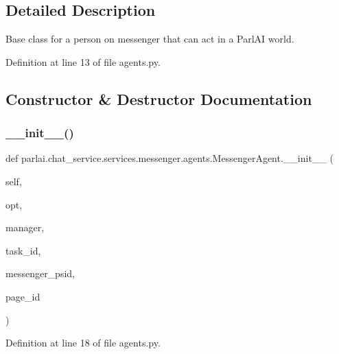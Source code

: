 \subsection{Detailed Description}
\begin{DoxyVerb}Base class for a person on messenger that can act in a ParlAI world.
\end{DoxyVerb}
 

Definition at line 13 of file agents.\+py.



\subsection{Constructor \& Destructor Documentation}
\mbox{\label{classparlai_1_1chat__service_1_1services_1_1messenger_1_1agents_1_1MessengerAgent_ae6235d9673cc211634aa461e0cc74de9}} 
\subsubsection{\texorpdfstring{\+\_\+\+\_\+init\+\_\+\+\_\+()}{\_\_init\_\_()}}
{\footnotesize\ttfamily def parlai.\+chat\+\_\+service.\+services.\+messenger.\+agents.\+Messenger\+Agent.\+\_\+\+\_\+init\+\_\+\+\_\+ (\begin{DoxyParamCaption}\item[{}]{self,  }\item[{}]{opt,  }\item[{}]{manager,  }\item[{}]{task\+\_\+id,  }\item[{}]{messenger\+\_\+psid,  }\item[{}]{page\+\_\+id }\end{DoxyParamCaption})}



Definition at line 18 of file agents.\+py.


